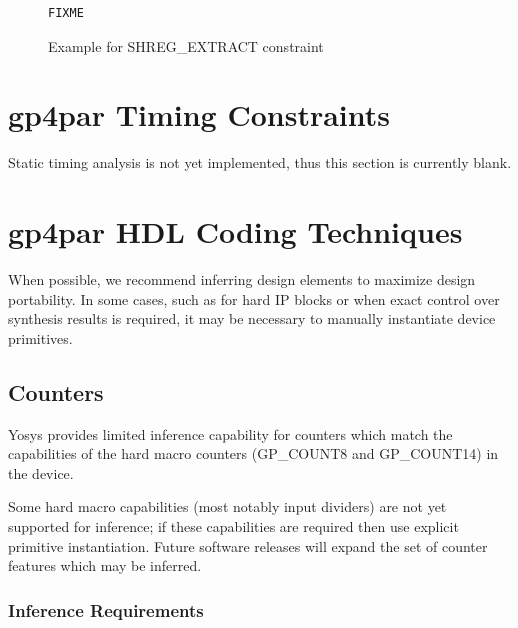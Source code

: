 \documentclass[11pt]{article}
\begin{document}
\begin{figure}[h]
\begin{lstlisting}
FIXME
\end{lstlisting}
\caption{Example for SHREG\_EXTRACT constraint}
\label{constraint-shreg-extract}
\end{figure}


\pagebreak
\section{gp4par Timing Constraints}

Static timing analysis is not yet implemented, thus this section is currently blank.


\pagebreak
\section{gp4par HDL Coding Techniques}

When possible, we recommend inferring design elements to maximize design portability. In some cases, such as for hard 
IP blocks or when exact control over synthesis results is required, it may be necessary to manually instantiate device 
primitives.


\subsection{Counters}

Yosys provides limited inference capability for counters which match the capabilities of the hard macro counters 
(GP\_COUNT8 and GP\_COUNT14) in the device.

Some hard macro capabilities (most notably input dividers) are not yet supported for inference; if these capabilities 
are required then use explicit primitive instantiation. Future software releases will expand the set of counter 
features which may be inferred.

\subsubsection{Inference Requirements}
\end{document}
